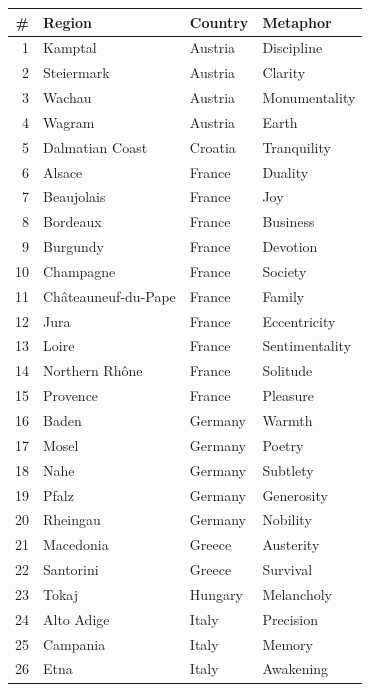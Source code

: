\documentclass[11pt]{article}
\begin{document}
\begin{center}
\renewcommand{\arraystretch}{1.05}
\small
\begin{tabular}{@{}r l l l@{}}
\toprule
\# & Region & Country & Metaphor \\
\midrule
1  & Kamptal              & Austria    & Discipline \\
2  & Steiermark           & Austria    & Clarity \\
3  & Wachau               & Austria    & Monumentality \\
4  & Wagram               & Austria    & Earth \\
5  & Dalmatian Coast      & Croatia    & Tranquility \\
6  & Alsace               & France     & Duality \\
7  & Beaujolais           & France     & Joy \\
8  & Bordeaux             & France     & Business \\
9  & Burgundy             & France     & Devotion \\
10 & Champagne            & France     & Society \\
11 & Ch\^ateauneuf-du-Pape & France    & Family \\
12 & Jura                 & France     & Eccentricity \\
13 & Loire                & France     & Sentimentality \\
14 & Northern Rh\^one     & France     & Solitude \\
15 & Provence             & France     & Pleasure \\
16 & Baden                & Germany    & Warmth \\
17 & Mosel                & Germany    & Poetry \\
18 & Nahe                 & Germany    & Subtlety \\
19 & Pfalz                & Germany    & Generosity \\
20 & Rheingau             & Germany    & Nobility \\
21 & Macedonia            & Greece     & Austerity \\
22 & Santorini            & Greece     & Survival \\
23 & Tokaj                & Hungary    & Melancholy \\
24 & Alto Adige           & Italy      & Precision \\
25 & Campania             & Italy      & Memory \\
26 & Etna                 & Italy      & Awakening \\

\end{tabular}
\end{center}
\end{document}
